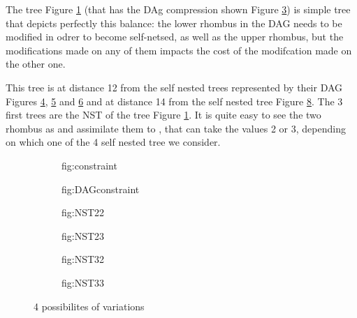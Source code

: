 The tree Figure \ref{fig:constraint} (that has the DAg compression shown
Figure \ref{fig:DAGconstraint}) is simple tree that depicts perfectly
this balance: the lower rhombus in the DAG needs to be modified in
odrer to become self-netsed, as well as the upper rhombus, but the
modifications made on any of them impacts the cost of the modifcation
made on the other one. 

This tree is at distance 12 from the self nested trees represented by
their DAG Figures \ref{fig:NST22}, \ref{fig:NST23} and \ref{fig:NST32}
and at distance 14 from the self nested tree Figure
\ref{fig:NST33}. The 3 first trees are the NST of the tree Figure
\ref{fig:constraint}. It is quite easy to see the two rhombus as
\widgets and assimilate them to \variables, that can take the values 2
or 3, depending on which one of the 4 self nested tree we consider.


\begin{figure}
 \begin{subfigure}[b]{0.45\textwidth}
    \centering
    \caption{fig:constraint}
    \label{fig:constraint}
  \end{subfigure}
  \quad
  \begin{subfigure}[b]{0.45\textwidth}
    \centering
    \caption{fig:DAGconstraint}
    \label{fig:DAGconstraint}
  \end{subfigure} 
  \caption{}%
\end{figure}

\begin{figure}
 \begin{subfigure}[b]{0.22\textwidth}
    \centering
    \caption{fig:NST22}
    \label{fig:NST22}
  \end{subfigure}
  \quad
  \begin{subfigure}[b]{0.22\textwidth}
    \centering
    \caption{fig:NST23}
    \label{fig:NST23}
  \end{subfigure}
  \quad
  \begin{subfigure}[b]{0.22\textwidth}
    \centering
    \caption{fig:NST32}
    \label{fig:NST32}
  \end{subfigure}
  \quad
  \begin{subfigure}[b]{0.22\textwidth}
    \centering
    \caption{fig:NST33}
    \label{fig:NST33}
  \end{subfigure} 
  \caption{4 possibilites of variations}%
\end{figure}

